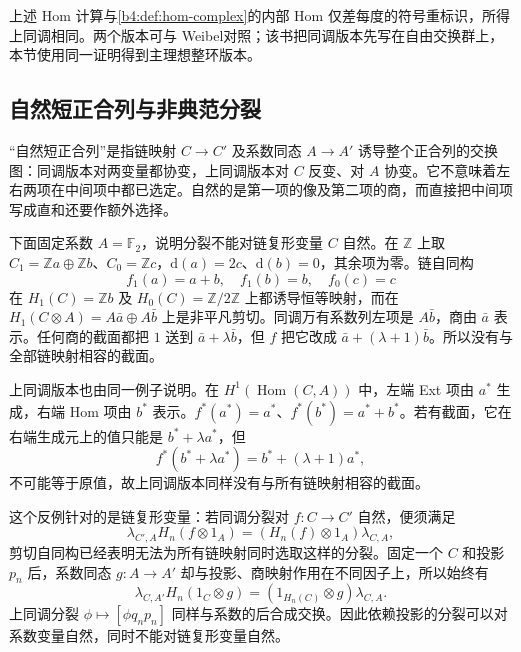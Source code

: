 上述 Hom 计算与\cref{b4:def:hom-complex}的内部 Hom 仅差每度的符号重标识，所得上同调相同。两个版本可与 Weibel\cite[Universal Coefficient Theorem for Homology 3.6.2, Universal Coefficient Theorem for Cohomology 3.6.5]{Weibel1994HomologicalAlgebra}对照；该书把同调版本先写在自由交换群上，本节使用同一证明得到主理想整环版本。

\subsection{自然短正合列与非典范分裂}
\label{b4:subsec:0903:02}

“自然短正合列”是指链映射 \(C\to C'\) 及系数同态 \(A\to A'\) 诱导整个正合列的交换图：同调版本对两变量都协变，上同调版本对 \(C\) 反变、对 \(A\) 协变。它不意味着左右两项在中间项中都已选定。自然的是第一项的像及第二项的商，而直接把中间项写成直和还要作额外选择。

\begin{example}\label{b4:exm:uct-no-natural-splitting}
	下面固定系数 \(A=\mathbb F_2\)，说明分裂不能对链复形变量 \(C\) 自然。在 \(\mathbb Z\) 上取 \(C_1=\mathbb Za\oplus\mathbb Zb\)、\(C_0=\mathbb Zc\)，\(\mathrm{d}(a)=2c\)、\(\mathrm{d}(b)=0\)，其余项为零。链自同构
	\[
		f_1(a)=a+b,\quad f_1(b)=b,\quad f_0(c)=c
	\]
	在 \(H_1(C)=\mathbb Zb\) 及 \(H_0(C)=\mathbb Z/2\mathbb Z\) 上都诱导恒等映射，而在 \(H_1(C\otimes A)=A\bar a\oplus A\bar b\) 上是非平凡剪切。同调万有系数列左项是 \(A\bar b\)，商由 \(\bar a\) 表示。任何商的截面都把 \(1\) 送到 \(\bar a+\lambda\bar b\)，但 \(f\) 把它改成 \(\bar a+(\lambda+1)\bar b\)。所以没有与全部链映射相容的截面。

	\ProseParagraphBreak
	上同调版本也由同一例子说明。在 \(H^1(\operatorname{Hom}(C,A))\) 中，左端 Ext 项由 \(a^*\) 生成，右端 Hom 项由 \(b^*\) 表示。\(f^*(a^*)=a^*\)、\(f^*(b^*)=a^*+b^*\)。若有截面，它在右端生成元上的值只能是 \(b^*+\lambda a^*\)，但
	\[
		f^*(b^*+\lambda a^*)=b^*+(\lambda+1)a^*,
	\]
	不可能等于原值，故上同调版本同样没有与所有链映射相容的截面。
\end{example}

这个反例针对的是链复形变量：若同调分裂对 \(f:C\to C'\) 自然，便须满足
\[
	\lambda_{C',A}H_n(f\otimes1_A) =(H_n(f)\otimes1_A)\lambda_{C,A},
\]
剪切自同构已经表明无法为所有链映射同时选取这样的分裂。固定一个 \(C\) 和投影 \(p_n\) 后，系数同态 \(g:A\to A'\) 却与投影、商映射作用在不同因子上，所以始终有
\[
	\lambda_{C,A'}H_n(1_C\otimes g) =(1_{H_n(C)}\otimes g)\lambda_{C,A}.
\]
上同调分裂 \(\phi\mapsto[\phi q_np_n]\) 同样与系数的后合成交换。因此依赖投影的分裂可以对系数变量自然，同时不能对链复形变量自然。

